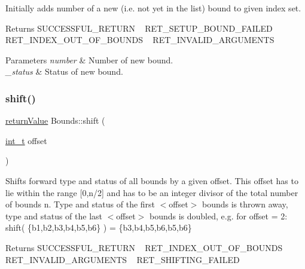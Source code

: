 Initially adds number of a new (i.\+e. not yet in the list) bound to given index set. \begin{DoxyReturn}{Returns}
S\+U\+C\+C\+E\+S\+S\+F\+U\+L\+\_\+\+R\+E\+T\+U\+RN ~\newline
 R\+E\+T\+\_\+\+S\+E\+T\+U\+P\+\_\+\+B\+O\+U\+N\+D\+\_\+\+F\+A\+I\+L\+ED ~\newline
 R\+E\+T\+\_\+\+I\+N\+D\+E\+X\+\_\+\+O\+U\+T\+\_\+\+O\+F\+\_\+\+B\+O\+U\+N\+DS ~\newline
 R\+E\+T\+\_\+\+I\+N\+V\+A\+L\+I\+D\+\_\+\+A\+R\+G\+U\+M\+E\+N\+TS 
\end{DoxyReturn}

\begin{DoxyParams}{Parameters}
{\em number} & Number of new bound. \\
\hline
{\em \+\_\+status} & Status of new bound. \\
\hline
\end{DoxyParams}
\mbox{\label{class_bounds_a05b63d074b95ae4d5fc4c7cfe11e7228}} 
\subsubsection{\texorpdfstring{shift()}{shift()}}
{\footnotesize\ttfamily \hyperlink{_message_handling_8hpp_a81d556f613bfbabd0b1f9488c0fa865e}{return\+Value} Bounds\+::shift (\begin{DoxyParamCaption}\item[{\hyperlink{_types_8hpp_ab6fd6105e64ed14a0c9281326f05e623}{int\+\_\+t}}]{offset }\end{DoxyParamCaption})\hspace{0.3cm}{\ttfamily [virtual]}}

Shifts forward type and status of all bounds by a given offset. This offset has to lie within the range \mbox{[}0,n/2\mbox{]} and has to be an integer divisor of the total number of bounds n. Type and status of the first $<$offset$>$ bounds is thrown away, type and status of the last $<$offset$>$ bounds is doubled, e.\+g. for offset = 2\+: ~\newline
shift( \{b1,b2,b3,b4,b5,b6\} ) = \{b3,b4,b5,b6,b5,b6\} \begin{DoxyReturn}{Returns}
S\+U\+C\+C\+E\+S\+S\+F\+U\+L\+\_\+\+R\+E\+T\+U\+RN ~\newline
 R\+E\+T\+\_\+\+I\+N\+D\+E\+X\+\_\+\+O\+U\+T\+\_\+\+O\+F\+\_\+\+B\+O\+U\+N\+DS ~\newline
 R\+E\+T\+\_\+\+I\+N\+V\+A\+L\+I\+D\+\_\+\+A\+R\+G\+U\+M\+E\+N\+TS ~\newline
 R\+E\+T\+\_\+\+S\+H\+I\+F\+T\+I\+N\+G\+\_\+\+F\+A\+I\+L\+ED 
\end{DoxyReturn}

